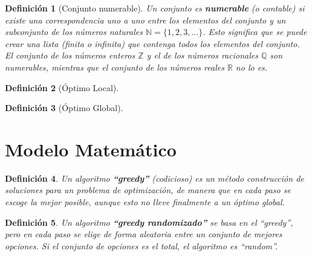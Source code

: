 \documentclass[12pt,a4paper]{book}
\newtheorem{defi}{Definición}[section]
\begin{document}
\begin{defi}[Conjunto numerable]
Un conjunto es \textbf{numerable} (o contable) si existe una correspondencia uno a uno entre los elementos del conjunto y un subconjunto de los números naturales $\mathbb{N} = \{1, 2, 3, \dots\}$. Esto significa que se puede crear una lista (finita o infinita) que contenga todos los elementos del conjunto. El conjunto de los números enteros $\mathbb{Z}$ y el de los números racionales $\mathbb{Q}$ son numerables, mientras que el conjunto de los números reales $\mathbb{R}$ no lo es.
\end{defi}

\begin{defi}[Óptimo Local]

\end{defi}

\begin{defi}[Óptimo Global]

\end{defi}

\section{Modelo Matemático}

\begin{defi}
Un algoritmo \textbf{``greedy''} (codicioso) es un método construcción de soluciones para un problema de optimización,
de manera que en cada paso se escoge la mejor posible, aunque esto no lleve finalmente a un óptimo global.
\end{defi}

\bigskip

\begin{defi}
Un algoritmo \textbf{``greedy randomizado''} se basa en el ``greedy'', pero en cada paso se elige de forma aleatoria entre un conjunto de mejores opciones.
Si el conjunto de opciones es el total, el algoritmo es ``random''.
\end{defi}
\end{document}
